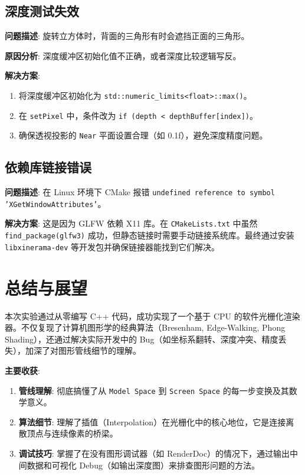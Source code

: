 \documentclass[a4paper]{article}
\begin{document}
\subsection{深度测试失效}
\textbf{问题描述}: 旋转立方体时，背面的三角形有时会遮挡正面的三角形。

\textbf{原因分析}: 深度缓冲区初始化值不正确，或者深度比较逻辑写反。

\textbf{解决方案}:
\begin{enumerate}
    \item 将深度缓冲区初始化为 \texttt{std::numeric\_limits<float>::max()}。
    \item 在 \texttt{setPixel} 中，条件改为 \texttt{if (depth < depthBuffer[index])}。
    \item 确保透视投影的 \texttt{Near} 平面设置合理（如 0.1f），避免深度精度问题。
\end{enumerate}

\subsection{依赖库链接错误}
\textbf{问题描述}: 在 Linux 环境下 CMake 报错 \texttt{undefined reference to symbol 'XGetWindowAttributes'}。

\textbf{解决方案}: 这是因为 GLFW 依赖 X11 库。在 \texttt{CMakeLists.txt} 中虽然 \texttt{find\_package(glfw3)} 成功，但静态链接时需要手动链接系统库。最终通过安装 \texttt{libxinerama-dev} 等开发包并确保链接器能找到它们解决。

\section{总结与展望}

本次实验通过从零编写 C++ 代码，成功实现了一个基于 CPU 的软件光栅化渲染器。不仅复现了计算机图形学的经典算法（Bresenham, Edge-Walking, Phong Shading），还通过解决实际开发中的 Bug（如坐标系翻转、深度冲突、精度丢失），加深了对图形管线细节的理解。

\textbf{主要收获}:
\begin{enumerate}
    \item \textbf{管线理解}: 彻底搞懂了从 \texttt{Model Space} 到 \texttt{Screen Space} 的每一步变换及其数学意义。
    \item \textbf{算法细节}: 理解了插值（Interpolation）在光栅化中的核心地位，它是连接离散顶点与连续像素的桥梁。
    \item \textbf{调试技巧}: 掌握了在没有图形调试器（如 RenderDoc）的情况下，通过输出中间数据和可视化 Debug（如输出深度图）来排查图形问题的方法。
\end{enumerate}
\end{document}

